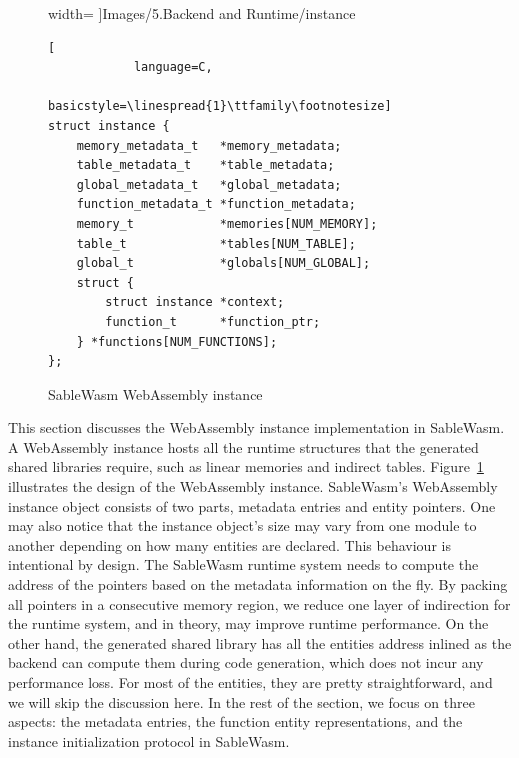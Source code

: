 \begin{figure}
\begin{minipage}{.35\textwidth}
            width=\textwidth
        ]{Images/5.Backend and Runtime/instance}
    \end{minipage}\hfill
    \begin{minipage}{.6\textwidth}
        \begin{lstlisting}[
            language=C, 
            basicstyle=\linespread{1}\ttfamily\footnotesize]
struct instance {
    memory_metadata_t   *memory_metadata;
    table_metadata_t    *table_metadata;
    global_metadata_t   *global_metadata;
    function_metadata_t *function_metadata;
    memory_t            *memories[NUM_MEMORY];
    table_t             *tables[NUM_TABLE];
    global_t            *globals[NUM_GLOBAL];
    struct {
        struct instance *context;
        function_t      *function_ptr;
    } *functions[NUM_FUNCTIONS];
};        
    \end{lstlisting}
    \end{minipage}
    \caption{SableWasm WebAssembly instance}
    \label{fig:backend-instance}
\end{figure}

This section discusses the WebAssembly instance implementation in SableWasm.
A WebAssembly instance hosts all the runtime structures that the generated
shared libraries require, such as linear memories and indirect tables.
Figure~\ref{fig:backend-instance} illustrates the design of the WebAssembly
instance. SableWasm's WebAssembly instance object consists of two parts,
metadata entries and entity pointers. One may also notice that the instance
object's size may vary from one module to another depending on how many entities
are declared. This behaviour is intentional by design. The SableWasm runtime
system needs to compute the address of the pointers based on the metadata
information on the fly. By packing all pointers in a consecutive memory region,
we reduce one layer of indirection for the runtime system, and in theory, may
improve runtime performance. On the other hand, the generated shared library
has all the entities address inlined as the backend can compute them during code
generation, which does not incur any performance loss. For most of the entities,
they are pretty straightforward, and we will skip the discussion here. In the
rest of the section, we focus on three aspects: the metadata entries,
the function entity representations, and the instance initialization protocol
in SableWasm.

